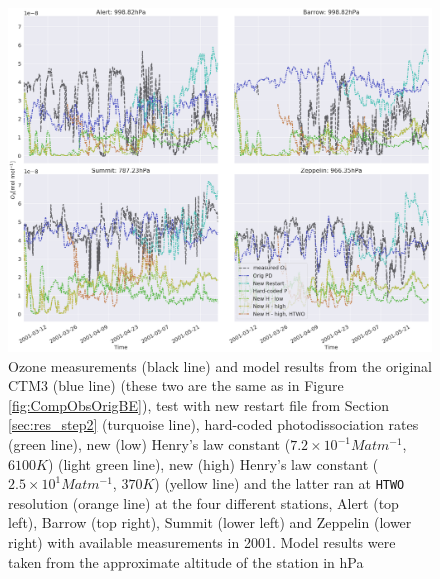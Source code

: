 \begin{figure}[ht]
    \centering
    \includegraphics[width=\linewidth]{Chapter6_Results/images/ozone_stationComp_2001/ozone_2001_step3.png}
    \caption{Ozone measurements (black line) and model results from the original CTM3 (blue line) (these two are the same as in Figure \ref{fig:CompObsOrigBE}), test with new restart file from Section \ref{sec:res_step2} (turquoise line), hard-coded photodissociation rates (green line), new (low) Henry's law constant ($7.2\times10^{-1} M atm ^{-1}$, $6100 K$) (light green line), new (high) Henry's law constant ($2.5\times10^{1} M atm ^{-1}$, $370 K$) (yellow line) and the latter ran at \texttt{HTWO} resolution (orange line) at the four different stations, Alert (top left), Barrow (top right), Summit (lower left) and Zeppelin (lower right) with available measurements in 2001. Model results were taken from the approximate altitude of the station in hPa \protect\footnotemark}
    \label{fig:ozone_2001_step3}
\end{figure}






